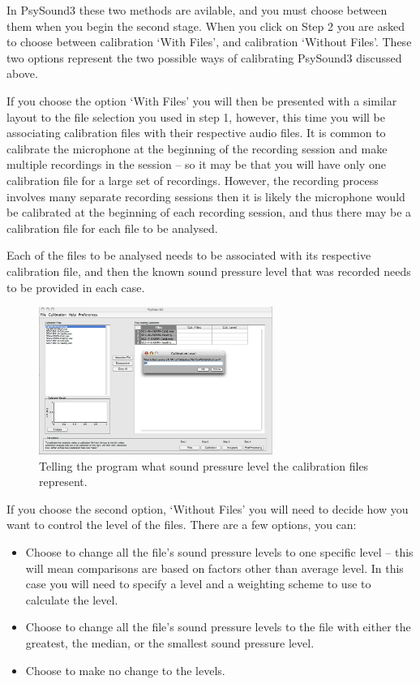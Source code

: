 \documentclass{article}
\begin{document}
In PsySound3 these two methods are avilable, and you must choose between them when you begin the second stage. When you click on Step 2 you are asked to choose between calibration `With Files', and calibration `Without Files'. These two options represent the two possible ways of calibrating PsySound3 discussed above. 

If you choose the option `With Files' you will then be presented with a similar layout to the file selection you used in step 1, however, this time you will be associating calibration files with their respective audio files. It is common to calibrate the microphone at the beginning of the recording session and make multiple recordings in the session -- so it may be that you will have only one calibration file for a large set of recordings. However, the recording process involves many separate recording sessions then it is likely the microphone would be calibrated at the beginning of each recording session, and thus there may be a calibration file for each file to be analysed.

Each of the files to be analysed needs to be associated with its respective calibration file, and then the known sound pressure level that was recorded needs to be provided in each case. 

\begin{figure}[htbp]
	\centering
		\includegraphics[width=3in]{Step2-SupplyLevel.jpg}
	\caption{Telling the program what sound pressure level the calibration files represent.}
	\label{fig:stage05}
\end{figure}

If you choose the second option, `Without Files' you will need to decide how you want to control the level of the files. There are a few options, you can:

\begin{itemize} 
\item Choose to change all the file's sound pressure levels to one specific  level -- this will mean comparisons are based on factors other than average level. In this case you will need to specify a level and a weighting scheme to use to calculate the level.
\item Choose to change all the file's sound pressure levels to the file with  either the greatest, the median, or the smallest sound pressure level.
\item Choose to make no change to the levels. 
\end{itemize}
\end{document}
